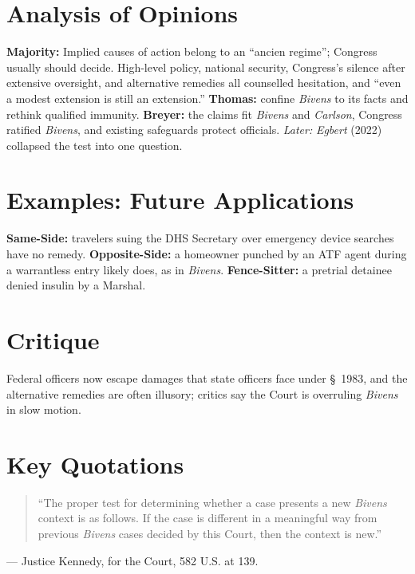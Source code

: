 \documentclass[12pt]{article}
\begin{document}
\section{Analysis of Opinions}
\textbf{Majority:} Implied causes of action belong to an ``ancien regime''; Congress usually should decide. High-level policy, national security, Congress's silence after extensive oversight, and alternative remedies all counselled hesitation, and ``even a modest extension is still an extension.'' \textbf{Thomas:} confine \textit{Bivens} to its facts and rethink qualified immunity. \textbf{Breyer:} the claims fit \textit{Bivens} and \textit{Carlson}, Congress ratified \textit{Bivens}, and existing safeguards protect officials. \emph{Later:} \textit{Egbert} (2022) collapsed the test into one question.

\section{Examples: Future Applications}
\textbf{Same-Side:} travelers suing the DHS Secretary over emergency device searches have no remedy. \textbf{Opposite-Side:} a homeowner punched by an ATF agent during a warrantless entry likely does, as in \textit{Bivens}. \textbf{Fence-Sitter:} a pretrial detainee denied insulin by a Marshal.

\section{Critique}
Federal officers now escape damages that state officers face under \S~1983, and the alternative remedies are often illusory; critics say the Court is overruling \textit{Bivens} in slow motion.

\section{Key Quotations}
\begin{quote}
``The proper test for determining whether a case presents a new \textit{Bivens} context is as follows. If the case is different in a meaningful way from previous \textit{Bivens} cases decided by this Court, then the context is new.''
\end{quote}
\noindent --- Justice Kennedy, for the Court, 582 U.S. at 139.
\end{document}
